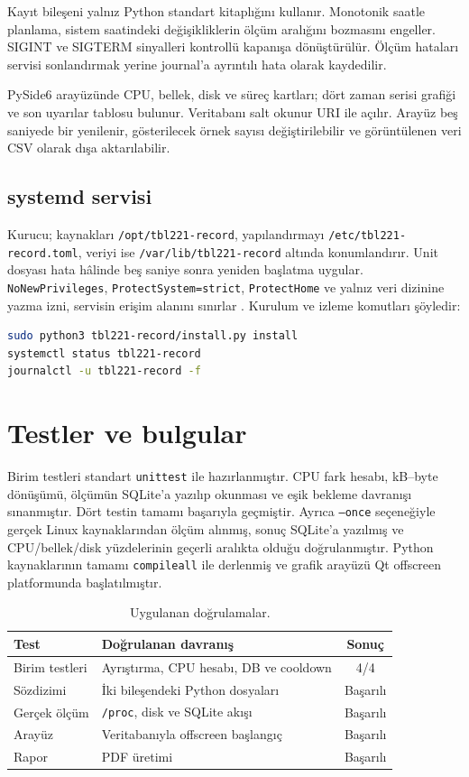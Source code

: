 \documentclass[9pt,a4paper,twocolumn]{extarticle}
\begin{document}
Kayıt bileşeni yalnız Python standart kitaplığını kullanır. Monotonik saatle planlama, sistem saatindeki değişikliklerin ölçüm aralığını bozmasını engeller. SIGINT ve SIGTERM sinyalleri kontrollü kapanışa dönüştürülür. Ölçüm hataları servisi sonlandırmak yerine journal'a ayrıntılı hata olarak kaydedilir.

PySide6 arayüzünde CPU, bellek, disk ve süreç kartları; dört zaman serisi grafiği ve son uyarılar tablosu bulunur. Veritabanı salt okunur URI ile açılır. Arayüz beş saniyede bir yenilenir, gösterilecek örnek sayısı değiştirilebilir ve görüntülenen veri CSV olarak dışa aktarılabilir.

\subsection{systemd servisi}

Kurucu; kaynakları \texttt{/opt/tbl221-record}, yapılandırmayı \texttt{/etc/tbl221-record.toml}, veriyi ise \texttt{/var/lib/tbl221-record} altında konumlandırır. Unit dosyası hata hâlinde beş saniye sonra yeniden başlatma uygular. \texttt{NoNewPrivileges}, \texttt{ProtectSystem=strict}, \texttt{ProtectHome} ve yalnız veri dizinine yazma izni, servisin erişim alanını sınırlar \cite{systemdexec}. Kurulum ve izleme komutları şöyledir:

\begin{lstlisting}[language=bash]
sudo python3 tbl221-record/install.py install
systemctl status tbl221-record
journalctl -u tbl221-record -f
\end{lstlisting}

\section{Testler ve bulgular}

Birim testleri standart \texttt{unittest} ile hazırlanmıştır. CPU fark hesabı, kB--byte dönüşümü, ölçümün SQLite'a yazılıp okunması ve eşik bekleme davranışı sınanmıştır. Dört testin tamamı başarıyla geçmiştir. Ayrıca \texttt{--once} seçeneğiyle gerçek Linux kaynaklarından ölçüm alınmış, sonuç SQLite'a yazılmış ve CPU/bellek/disk yüzdelerinin geçerli aralıkta olduğu doğrulanmıştır. Python kaynaklarının tamamı \texttt{compileall} ile derlenmiş ve grafik arayüzü Qt offscreen platformunda başlatılmıştır.

\begin{table}[ht]
\centering
\caption{Uygulanan doğrulamalar.}
\label{tab:testler}
\begin{tabularx}{\columnwidth}{@{}p{22mm}Xc@{}}
\toprule
Test & Doğrulanan davranış & Sonuç \\
\midrule
Birim testleri & Ayrıştırma, CPU hesabı, DB ve cooldown & 4/4 \\
Sözdizimi & İki bileşendeki Python dosyaları & Başarılı \\
Gerçek ölçüm & \texttt{/proc}, disk ve SQLite akışı & Başarılı \\
Arayüz & Veritabanıyla offscreen başlangıç & Başarılı \\
Rapor & PDF üretimi & Başarılı \\
\bottomrule
\end{tabularx}
\end{table}
\end{document}
